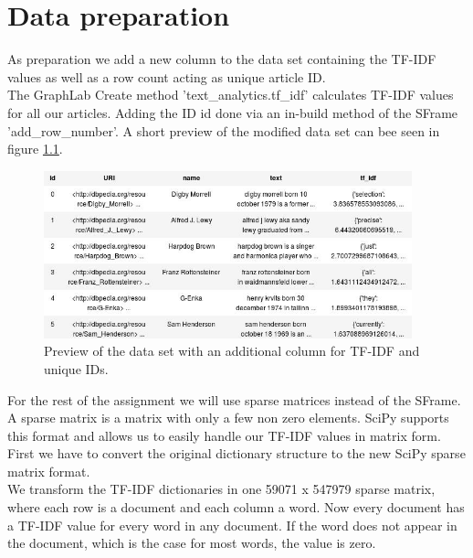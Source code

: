 \documentclass[12pt]{scrreprt}
\begin{document}
\chapter{Data preparation}
\label{chpt:tasks}

As preparation we add a new column to the data set containing the TF-IDF values as well as a row count acting as unique article ID.\\

The GraphLab Create method 'text\_analytics.tf\_idf' calculates TF-IDF values for all our articles. Adding the ID id done via an in-build method of the SFrame 'add\_row\_number'. A short preview of the modified data set can bee seen in figure \ref{fig:dataset}.\\

\begin{figure}[H]
  \begin{center}
    \caption{Preview of the data set with an additional column for TF-IDF and unique IDs.}
    \label{fig:dataset}
    \includegraphics[width=0.95\textwidth, angle=0]{db_wiki_word_counts_and_id.jpg}
  \end{center}
\end{figure}

For the rest of the assignment we will use sparse matrices instead of the SFrame. A sparse matrix is a matrix with only a few non zero elements. SciPy supports this format and allows us to easily handle our TF-IDF values in matrix form. First we have to convert the original dictionary structure to the new SciPy sparse matrix format.\\

We transform the TF-IDF dictionaries in one 59071 x 547979 sparse matrix, where each row is a document and each column a word. Now every document has a TF-IDF value for every word in any document. If the word does not appear in the document, which is the case for most words, the value is zero.\\
\end{document}
